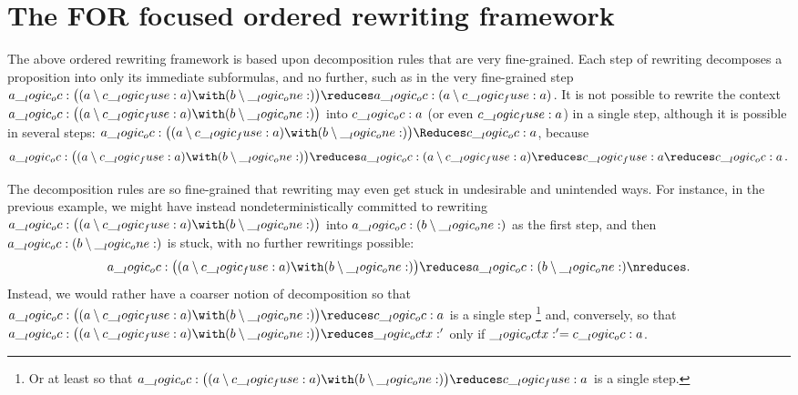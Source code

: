 \section{The \acs*{FOR} focused ordered rewriting framework}

The above ordered rewriting framework is based upon decomposition rules that are very fine-grained.
Each step of rewriting decomposes a proposition into only its immediate subformulas, and no further, such as in the very fine-grained step $a \oc \bigl((a \limp c \fuse a) \with (b \limp \one)\bigr) \reduces a \oc (a \limp c \fuse a)$.
It is not possible to rewrite the context $a \oc \bigl((a \limp c \fuse a) \with (b \limp \one)\bigr)$ into $c \__logic_oc: a$ (or even $c \__logic_fuse: a$) in a single step, although it is possible in several steps: $a \oc \bigl((a \limp c \fuse a) \with (b \limp \one)\bigr) \Reduces c \oc a$, because
\begin{equation*}
  a \oc \bigl((a \limp c \fuse a) \with (b \limp \one)\bigr) \reduces a \oc (a \limp c \fuse a) \reduces c \fuse a \reduces c \oc a
  \,.
\end{equation*}

The decomposition rules are so fine-grained that rewriting may even get stuck in undesirable and unintended ways.
For instance, in the previous example, we might have instead nondeterministically committed to rewriting $a \oc \bigl((a \limp c \fuse a) \with (b \limp \one)\bigr)$ into $a \__logic_oc: (b \mathbin { \setminus } \__logic_one:)$ as the first step, and then $a \__logic_oc: (b \mathbin { \setminus } \__logic_one:)$ is stuck, with no further rewritings possible:
\begin{equation*}
  a \oc \bigl((a \limp c \fuse a) \with (b \limp \one)\bigr)
    \reduces a \oc (b \limp \one)
    \nreduces
    \!\,.
\end{equation*}
Instead, we would rather have a coarser notion of decomposition so that $a \oc \bigl((a \limp c \fuse a) \with (b \limp \one)\bigr) \reduces c \oc a$ is a single step%
\footnote{Or at least so that $a \oc \bigl((a \limp c \fuse a) \with (b \limp \one)\bigr) \reduces c \fuse a$ is a single step.}
and, conversely, so that $a \oc \bigl((a \limp c \fuse a) \with (b \limp \one)\bigr) \reduces \octx'$ only if $\__logic_octx:' = c \__logic_oc: a$.

